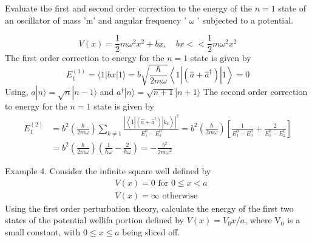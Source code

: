 \begin{exercise}
	 Evaluate the first and second order correction to the energy of the $n=1$ state of an oscillator of mass 'm' and angular frequency ' $\omega$ ' subjected to a potential.
\end{exercise}
\begin{answer}
	$$
	V(x)=\frac{1}{2} m \omega^{2} x^{2}+b x, \quad b x<<\frac{1}{2} m \omega^{2} x^{2}
	$$
	The first order correction to energy for the $n=1$ state is given by
	$$
	E_{1}^{(1)}=\langle 1|b x| 1\rangle=b \sqrt{\frac{\hbar}{2 m \omega}}\left\langle 1\left|\left(\hat{a}+\hat{a}^{\dagger}\right)\right| 1\right\rangle=0
	$$
	Using, $a|n\rangle=\sqrt{n}|n-1\rangle$ and $a^{\dagger}|n\rangle=\sqrt{n+1}|n+1\rangle$
	The second order correction to energy for the $n=1$ state is given by
	$$
	\begin{aligned}
	E_{1}^{(2)} &=b^{2}\left(\frac{\hbar}{2 m \omega}\right) \sum_{k \neq 1} \frac{\left|\left\langle 1\left|\left(\hat{a}+\hat{a}^{\dagger}\right)\right| k_{k}\right\rangle\right|^{2}}{E_{1}^{0}-E_{k}^{0}}=b^{2}\left(\frac{\hbar}{2 m \omega}\right)\left[\frac{1}{E_{1}^{0}-E_{0}^{0}}+\frac{2}{E_{1}^{0}-E_{2}^{0}}\right] \\
	&=b^{2}\left(\frac{\hbar}{2 m \omega}\right)\left(\frac{1}{\hbar \omega}-\frac{2}{\hbar \omega}\right)=-\frac{b^{2}}{2 m \omega^{2}}
	\end{aligned}
	$$
\end{answer}
\begin{exercise}
	Example 4. Consider the infinite square well defined by
	$$
	\begin{aligned}
	&V(x)=0 \text { for } 0 \leq x<a \\
	&V(x)=\infty \text { otherwise }
	\end{aligned}
	$$
	Using the first order perturbation theory, calculate the energy of the first two states of the potential wellifa portion defined by $V(x)=V_{0} x / a$, where $\mathrm{V}_{0}$ is a small constant, with $0 \leq x \leq a$ being sliced off.
\end{exercise}
